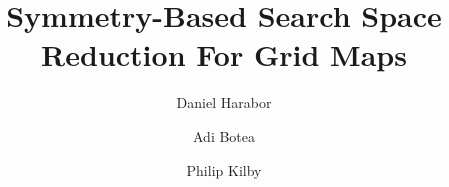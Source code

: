 \documentclass{article}
\begin{document}
\title{Symmetry-Based Search Space Reduction For Grid Maps}
\author{Daniel Harabor}
\author{Adi Botea}
\author{Philip Kilby}

\maketitle















\end{document}
